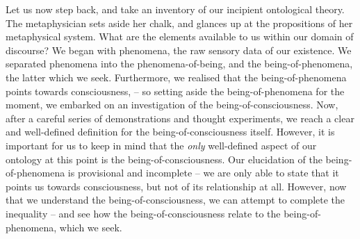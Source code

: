 Let us now step back, and take an inventory of our incipient ontological theory. The metaphysician sets aside her chalk, and glances up at the propositions of her metaphysical system. What are the elements available to us within our domain of discourse? We began with phenomena, the raw sensory data of our existence. We separated phenomena into the phenomena-of-being, and the being-of-phenomena, the latter which we seek. Furthermore, we realised that the being-of-phenomena points towards consciousness, -- so setting aside the being-of-phenomena for the moment, we embarked on an investigation of the being-of-consciousness. Now, after a careful series of demonstrations and thought experiments, we reach a clear and well-defined definition for the being-of-consciousness itself. However, it is important for us to keep in mind that the \emph{only} well-defined aspect of our ontology at this point is the being-of-consciousness. Our elucidation of the being-of-phenomena is provisional and incomplete -- we are only able to state that it points us towards consciousness, but not of its relationship at all. However, now that we understand the being-of-consciousness, we can attempt to complete the inequality -- and see how the being-of-consciousness relate to the being-of-phenomena, which we seek.


